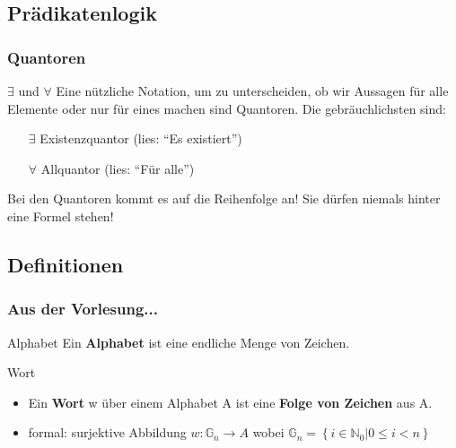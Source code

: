 
\subsection{Prädikatenlogik}
\begin{frame}
	\frametitle{Quantoren}
	\begin{block}{$\exists$ und $\forall$}
	Eine nützliche Notation, um zu unterscheiden, ob wir Aussagen für alle Elemente oder nur für eines machen sind Quantoren. Die gebräuchlichsten sind:
	\begin{itemize}
		\item[$\exists$] Existenzquantor (lies: "`Es existiert"')
		\item[$\forall$] Allquantor (lies: "`Für alle"')
	\end{itemize}
	Bei den Quantoren kommt es auf die Reihenfolge an! Sie dürfen niemals hinter eine Formel stehen!
	\end{block}
\end{frame}

\subsection{Definitionen}
\begin{frame}
	\frametitle{Aus der Vorlesung...}
	\begin{block}{Alphabet}
	Ein \textbf{Alphabet} ist eine endliche Menge von Zeichen.
	\end{block}

	\pause
	\begin{block}{Wort}
		\begin{itemize}
			\item Ein \textbf{Wort} w über einem Alphabet A ist eine \textbf{Folge von Zeichen} aus A.	\pause
			\item formal: surjektive Abbildung $w : \mathbb G_n \rightarrow A$ wobei $\mathbb G_n = \left\{i \in \mathbb N_0 | 0 \leq i < n\right\}$

		\end{itemize}
	\end{block}
\end{frame}

